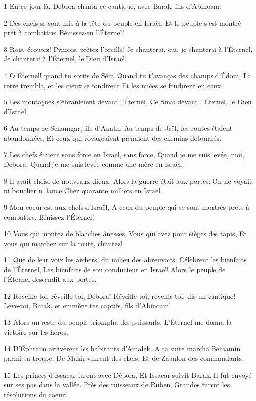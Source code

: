 \par 1 En ce jour-là, Débora chanta ce cantique, avec Barak, fils d'Abinoam:
\par 2 Des chefs se sont mis à la tête du peuple en Israël, Et le peuple s'est montré prêt à combattre: Bénissez-en l'Éternel!
\par 3 Rois, écoutez! Princes, prêtez l'oreille! Je chanterai, oui, je chanterai à l'Éternel, Je chanterai à l'Éternel, le Dieu d'Israël.
\par 4 O Éternel! quand tu sortis de Séir, Quand tu t'avanças des champs d'Édom, La terre trembla, et les cieux se fondirent Et les nuées se fondirent en eaux;
\par 5 Les montagnes s'ébranlèrent devant l'Éternel, Ce Sinaï devant l'Éternel, le Dieu d'Israël.
\par 6 Au temps de Schamgar, fils d'Anath, Au temps de Jaël, les routes étaient abandonnées, Et ceux qui voyageaient prenaient des chemins détournés.
\par 7 Les chefs étaient sans force en Israël, sans force, Quand je me suis levée, moi, Débora, Quand je me suis levée comme une mère en Israël.
\par 8 Il avait choisi de nouveaux dieux: Alors la guerre était aux portes; On ne voyait ni bouclier ni lance Chez quarante milliers en Israël.
\par 9 Mon coeur est aux chefs d'Israël, A ceux du peuple qui se sont montrés prêts à combattre. Bénissez l'Éternel!
\par 10 Vous qui montez de blanches ânesses, Vous qui avez pour sièges des tapis, Et vous qui marchez sur la route, chantez!
\par 11 Que de leur voix les archers, du milieu des abreuvoirs, Célèbrent les bienfaits de l'Éternel, Les bienfaits de son conducteur en Israël! Alors le peuple de l'Éternel descendit aux portes.
\par 12 Réveille-toi, réveille-toi, Débora! Réveille-toi, réveille-toi, dis un cantique! Lève-toi, Barak, et emmène tes captifs, fils d'Abinoam!
\par 13 Alors un reste du peuple triompha des puissants, L'Éternel me donna la victoire sur les héros.
\par 14 D'Éphraïm arrivèrent les habitants d'Amalek. A ta suite marcha Benjamin parmi ta troupe. De Makir vinrent des chefs, Et de Zabulon des commandants.
\par 15 Les princes d'Issacar furent avec Débora, Et Issacar suivit Barak, Il fut envoyé sur ses pas dans la vallée. Près des ruisseaux de Ruben, Grandes furent les résolutions du coeur!

